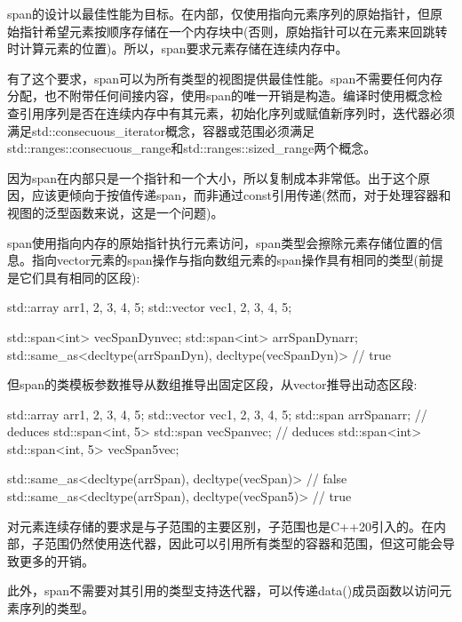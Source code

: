
span的设计以最佳性能为目标。在内部，仅使用指向元素序列的原始指针，但原始指针希望元素按顺序存储在一个内存块中(否则，原始指针可以在元素来回跳转时计算元素的位置)。所以，span要求元素存储在连续内存中。

有了这个要求，span可以为所有类型的视图提供最佳性能。span不需要任何内存分配，也不附带任何间接内容，使用span的唯一开销是构造。编译时使用概念检查引用序列是否在连续内存中有其元素，初始化序列或赋值新序列时，迭代器必须满足std::consecuous\_iterator概念，容器或范围必须满足std::ranges::consecuous\_range和std::ranges::sized\_range两个概念。

因为span在内部只是一个指针和一个大小，所以复制成本非常低。出于这个原因，应该更倾向于按值传递span，而非通过const引用传递(然而，对于处理容器和视图的泛型函数来说，这是一个问题)。


span使用指向内存的原始指针执行元素访问，span类型会擦除元素存储位置的信息。指向vector元素的span操作与指向数组元素的span操作具有相同的类型(前提是它们具有相同的区段):

\begin{cpp}
std::array arr{1, 2, 3, 4, 5};
std::vector vec{1, 2, 3, 4, 5};

std::span<int> vecSpanDyn{vec};
std::span<int> arrSpanDyn{arr};
std::same_as<decltype(arrSpanDyn), decltype(vecSpanDyn)> // true
\end{cpp}

但span的类模板参数推导从数组推导出固定区段，从vector推导出动态区段:

\begin{cpp}
std::array arr{1, 2, 3, 4, 5};
std::vector vec{1, 2, 3, 4, 5};
std::span arrSpan{arr}; // deduces std::span<int, 5>
std::span vecSpan{vec}; // deduces std::span<int>
std::span<int, 5> vecSpan5{vec};

std::same_as<decltype(arrSpan), decltype(vecSpan)> // false
std::same_as<decltype(arrSpan), decltype(vecSpan5)> // true
\end{cpp}


对元素连续存储的要求是与子范围的主要区别，子范围也是C++20引入的。在内部，子范围仍然使用迭代器，因此可以引用所有类型的容器和范围，但这可能会导致更多的开销。

此外，span不需要对其引用的类型支持迭代器，可以传递data()成员函数以访问元素序列的类型。


